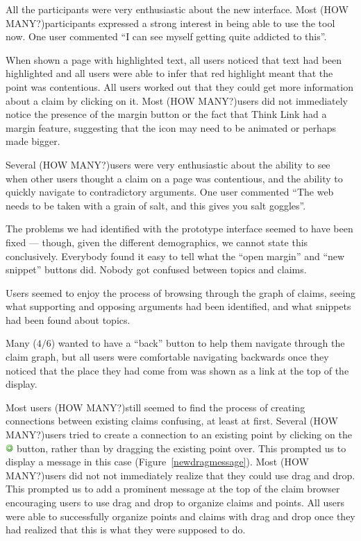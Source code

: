 \documentclass{chi2009}
\newcommand{\howmany}{{\color{red} (HOW MANY?)}}
\begin{document}
All the participants were very enthusiastic about the new interface. Most \howmany participants expressed a strong interest in being able to use the tool now. One user commented ``I can see myself getting quite addicted to this''.

When shown a page with highlighted text, all users noticed that text had been highlighted and all users were able to infer that red highlight meant that the point was contentious. All users worked out that they could get more information about a claim by clicking on it. Most \howmany users did not immediately notice the presence of the margin button or the fact that Think Link had a margin feature, suggesting that the icon may need to be animated or perhaps made bigger.

Several \howmany users were very enthusiastic about the ability to see when other users thought a claim on a page was contentious, and the ability to quickly navigate to contradictory arguments. One user commented ``The web needs to be taken with a grain of salt, and this gives you salt goggles''.

The problems we had identified with the prototype interface seemed to have been fixed --- though, given the different demographics, we cannot state this conclusively. Everybody found it easy to tell what the ``open margin'' and ``new snippet'' buttons did. Nobody got confused between topics and claims. 

Users seemed to enjoy the process of browsing through the graph of claims, seeing what supporting and opposing arguments had been identified, and what snippets had been found about topics.

Many ($4/6$) wanted to have a ``back'' button to help them navigate through the claim graph, but all users were comfortable navigating backwards once they noticed that the place they had come from was shown as a link at the top of the display.

Most users \howmany still seemed to find the process of creating connections between existing claims confusing, at least at first. Several \howmany users tried to create a connection to an existing point by clicking on the \includegraphics[width=0.3cm]{../images/add.png} button, rather than by dragging the existing point over. This prompted us to display a message in this case (Figure~\ref{newdragmessage}). Most \howmany users did not not immediately realize that they could use drag and drop. This prompted us to add a prominent message at the top of the claim browser encouraging users to use drag and drop to organize claims and points. All users were able to successfully organize points and claims with drag and drop once they had realized that this is what they were supposed to do.
\end{document}
